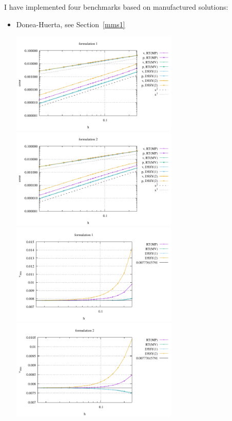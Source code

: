 I have implemented four benchmarks based on manufactured solutions:
\begin{itemize}
\item Donea-Huerta, see Section~\ref{mms1}

\begin{center}
\includegraphics[width=8cm]{python_codes/fieldstone_77/results/dh/errors_form1}
\includegraphics[width=8cm]{python_codes/fieldstone_77/results/dh/errors_form2}\\
\includegraphics[width=8cm]{python_codes/fieldstone_77/results/dh/vrms_form1}
\includegraphics[width=8cm]{python_codes/fieldstone_77/results/dh/vrms_form2}\\

\end{center}
\end{itemize}
